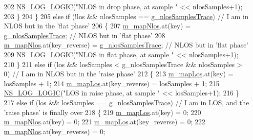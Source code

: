 \begin{DoxyCode}
202                         \hyperlink{group__logging_ga88acd260151caf2db9c0fc84997f45ce}{NS\_LOG\_LOGIC}(\textcolor{stringliteral}{"NLOS in drop phase, at sample "} <<  nlosSamples+1);
203                 \}       
204         \}
205         \textcolor{keywordflow}{else} \textcolor{keywordflow}{if} (!los && nlosSamples == \hyperlink{namespacens3_aa27c343924716ad4dac244babcba8297}{g\_nlosSamplesTrace}) \textcolor{comment}{// I am in NLOS but in the
       'flat phase'}
206         \{
207                 \hyperlink{classns3_1_1MmWaveLosTracker_ab8a492fa8798f2f775de311a6e619b19}{m\_mapNlos}.at(key) = \hyperlink{namespacens3_aa27c343924716ad4dac244babcba8297}{g\_nlosSamplesTrace}; \textcolor{comment}{// NLOS but in 'flat
       phase'}
208                 \hyperlink{classns3_1_1MmWaveLosTracker_ab8a492fa8798f2f775de311a6e619b19}{m\_mapNlos}.at(key\_reverse) = \hyperlink{namespacens3_aa27c343924716ad4dac244babcba8297}{g\_nlosSamplesTrace}; \textcolor{comment}{// NLOS but in
       'flat phase'}
209                 \hyperlink{group__logging_ga88acd260151caf2db9c0fc84997f45ce}{NS\_LOG\_LOGIC}(\textcolor{stringliteral}{"NLOS in flat phase, at sample "} << nlosSamples+1);
210         \}
211         \textcolor{keywordflow}{else} \textcolor{keywordflow}{if} (los && losSamples < g\_nlosSamplesTrace && nlosSamples > 0) \textcolor{comment}{// I am in NLOS but in the
       'raise phase'}
212         \{
213                 \hyperlink{classns3_1_1MmWaveLosTracker_a1ccd3a19ade5ca4b1e94bd113c593cd3}{m\_mapLos}.at(key) = losSamples + 1;
214                 \hyperlink{classns3_1_1MmWaveLosTracker_a1ccd3a19ade5ca4b1e94bd113c593cd3}{m\_mapLos}.at(key\_reverse) = losSamples + 1;
215                 \hyperlink{group__logging_ga88acd260151caf2db9c0fc84997f45ce}{NS\_LOG\_LOGIC}(\textcolor{stringliteral}{"LOS in raise phase, at sample "} << losSamples+1);
216         \}
217         \textcolor{keywordflow}{else} \textcolor{keywordflow}{if} (los && losSamples == \hyperlink{namespacens3_aa27c343924716ad4dac244babcba8297}{g\_nlosSamplesTrace}) \textcolor{comment}{// I am in LOS, and the 'raise
       phase' is finally over}
218         \{
219                 \hyperlink{classns3_1_1MmWaveLosTracker_a1ccd3a19ade5ca4b1e94bd113c593cd3}{m\_mapLos}.at(key) = 0;
220                 \hyperlink{classns3_1_1MmWaveLosTracker_ab8a492fa8798f2f775de311a6e619b19}{m\_mapNlos}.at(key) = 0;
221                 \hyperlink{classns3_1_1MmWaveLosTracker_a1ccd3a19ade5ca4b1e94bd113c593cd3}{m\_mapLos}.at(key\_reverse) = 0;
222                 \hyperlink{classns3_1_1MmWaveLosTracker_ab8a492fa8798f2f775de311a6e619b19}{m\_mapNlos}.at(key\_reverse) = 0;

\end{DoxyCode}
